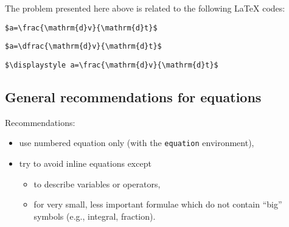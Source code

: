 		The problem presented here above is related to the following \LaTeX{} codes:
\begin{lstlisting}[language={[LaTeX]TeX}]
$a=\frac{\mathrm{d}v}{\mathrm{d}t}$
\end{lstlisting}
\begin{lstlisting}[language={[LaTeX]TeX}]
$a=\dfrac{\mathrm{d}v}{\mathrm{d}t}$
\end{lstlisting}
\begin{lstlisting}[language={[LaTeX]TeX}]
$\displaystyle a=\frac{\mathrm{d}v}{\mathrm{d}t}$
\end{lstlisting}
		
	
	\subsection{General recommendations for equations}
		
		Recommendations:
		\begin{itemize}
			\item use numbered equation only (with the \texttt{equation} environment),
			\item try to avoid inline equations except
			\begin{itemize}
				\item to describe variables or operators,
				\item for very small, less important formulae which do not contain \enquote{big} symbols (e.g., integral, fraction).
			\end{itemize}
		\end{itemize}


